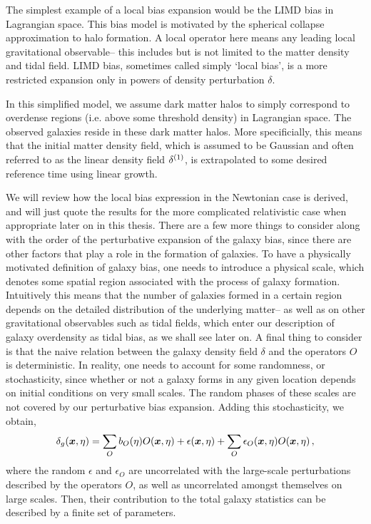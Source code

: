 The simplest example of a local bias expansion would be the LIMD bias in Lagrangian space. This bias model is motivated by the spherical collapse approximation to halo formation. A local operator here means any leading local gravitational observable-- this includes but is not limited to the matter density and tidal field. LIMD bias, sometimes called simply `local bias', is a more restricted expansion only in powers of density perturbation $\delta$.

In this simplified model, we assume dark matter halos to simply correspond to overdense regions (i.e. above some threshold density) in Lagrangian space. The observed galaxies reside in these dark matter halos. More specificially, this means that the initial matter density field, which is assumed to be Gaussian and often referred to as the linear density field $\delta^{(1)}$, is extrapolated to some desired reference time using linear growth. 

We will review how the local bias expression in the Newtonian case is derived, and will just quote the results for the more complicated relativistic case when appropriate later on in this thesis. There are a few more things to consider along with the order of the perturbative expansion of the galaxy bias, since there are other factors that play a role in the formation of galaxies. To have a physically motivated definition of galaxy bias, one needs to introduce a physical scale, which denotes some spatial region associated with the process of galaxy formation. Intuitively this means that the number of galaxies formed in a certain region depends on the detailed distribution of the underlying matter-- as well as on other gravitational observables such as tidal fields, which enter our description of galaxy overdensity as tidal bias, as we shall see later on. A final thing to consider is that the naive relation between the galaxy density field $\delta$ and the operators $O$ is deterministic. In reality, one needs to account for some randomness, or stochasticity, since whether or not a galaxy forms in any given location depends on initial conditions on very small scales. The random phases of these scales are not covered by our perturbative bias expansion. Adding this stochasticity, we obtain, 
\begin{equation}
	\delta_g(\bm {x}, \eta) = \sum_O b_O(\eta) O(\bm {x},\eta) + \epsilon(\bm {x},\eta) + \sum_O \epsilon_O(\bm {x},\eta) O(\bm {x},\eta)\,, 
\end{equation}
where the random $\epsilon$ and $\epsilon_O$ are uncorrelated with the large-scale perturbations described by the operators $O$, as well as uncorrelated amongst themselves on large scales. Then, their contribution to the total galaxy statistics can be described by a finite set of parameters. 

